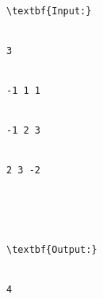 \begin{verbatim}
\textbf{Input:}


3


-1 1 1


-1 2 3


2 3 -2





\textbf{Output:}


4


\end{verbatim}